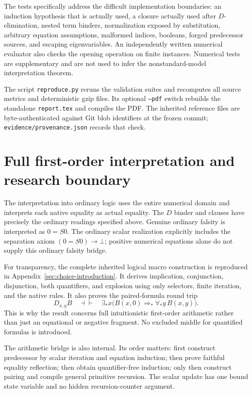 The tests specifically address the difficult implementation boundaries:
an induction hypothesis that is actually used, a closure actually
used after \(D\)-elimination, nested term binders, normalization
exposed by substitution, arbitrary equation assumptions, malformed
indices, booleans, forged predecessor sources, and escaping
eigenvariables. An independently written numerical evaluator also
checks the opening operation on finite instances. Numerical tests
are supplementary and are not used to infer the nonstandard-model
interpretation theorem.

The script \texttt{reproduce.py} reruns the validation suites and
recomputes all source metrics and deterministic gzip files.
Its optional \texttt{--pdf} switch rebuilds the standalone
\texttt{report.tex} and compiles the PDF. The inherited reference
files are byte-authenticated against Git blob identifiers at the
frozen commit; \texttt{evidence/provenance.json} records that check.

\section{Full first-order interpretation and research boundary}
\label{sec:interpretation-summary}

The interpretation into ordinary logic uses the entire numerical
domain and interprets each native equality as actual equality.
The \(D\) binder and clauses have precisely the ordinary readings
specified above. Genuine ordinary falsity is interpreted as \(0=S0\).
The ordinary scalar realization explicitly includes the separation
axiom \((0=S0)\to\bot\); positive numerical equations alone do not
supply this ordinary falsity bridge.

For transparency, the complete inherited logical macro construction
is reproduced in Appendix~\ref{sec:choice-introduction}.
It derives implication, conjunction, disjunction, both quantifiers,
and explosion using only selectors, finite iteration, and the
native rules. It also proves the paired-formula round trip
\[
 D_{x,y}B
 \quad\dashv\vdash\quad
 \exists_*x\bigl(B(x,0)\Rightarrow_*\forall_*y\,B(x,y)\bigr).
\]
This is why the result concerns full intuitionistic first-order
arithmetic rather than just an equational or negative fragment.
No excluded middle for quantified formulas is introduced.

The arithmetic bridge is also internal. Its order matters:
first construct predecessor by scalar iteration and equation
induction; then prove faithful equality reflection; then obtain
quantifier-free induction; only then construct pairing and compile
general primitive recursion. The scalar update has one bound
state variable and no hidden recursion-counter argument.

